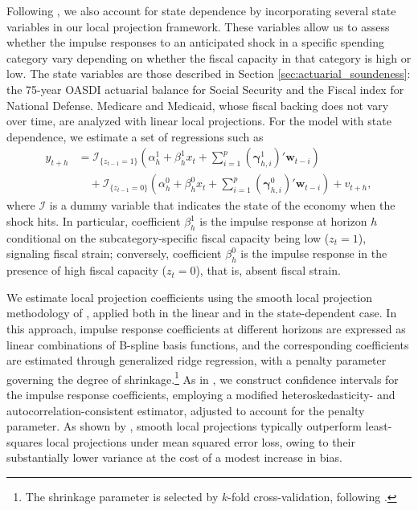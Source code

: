 \documentclass[12pt]{article}%
\theoremstyle{remark}
\begin{document}
Following \citet{RameyZuba2018}, we also account for state dependence by incorporating several state variables in our local projection framework. These variables allow us to assess whether the impulse responses to an anticipated shock in a specific spending category vary depending on whether the fiscal capacity in that category is high or low. The state variables are those described in Section \ref{sec:actuarial_soundeness}: the 75-year OASDI actuarial balance for Social Security and the Fiscal index for National Defense. Medicare and Medicaid, whose fiscal backing does not vary over time, are analyzed with linear local projections. For the model with state dependence, we estimate a set of regressions such as
\begin{align}
y_{t+h} 
&= \mathcal{I}_{\{z_{t-1}=1\}}\left(\alpha^1_{h} + \beta^1_{h} x_t + \sum_{i=1}^p \left(\bm{\gamma}^1_{h,i}\right)' \bm{w}_{t-i}\right) \nonumber \\ 
&\quad+ \mathcal{I}_{\{z_{t-1}=0\}}\left(\alpha^0_{h} + \beta^0_{h} x_t + \sum_{i=1}^p \left(\bm{\gamma}^0_{h,i}\right)' \bm{w}_{t-i}\right)
+ v_{t+h},
\label{eq:SDLP}
\end{align}
where $\mathcal{I}$ is a dummy variable that indicates the state of the economy when the shock hits. In particular, coefficient $\beta^1_h$ is the impulse response at horizon $h$ conditional on the subcategory-specific fiscal capacity being low ($z_t=1$), signaling fiscal strain; conversely, coefficient $\beta^0_h$ is the impulse response in the presence of high fiscal capacity ($z_t=0$), that is, absent fiscal strain.

We estimate local projection coefficients using the smooth local projection methodology of \citet{BarnichonBrownlees2019}, applied both in the linear and in the state-dependent case. In this approach, impulse response coefficients at different horizons are expressed as linear combinations of B-spline basis functions, and the corresponding coefficients are estimated through generalized ridge regression, with a penalty parameter governing the degree of shrinkage.\footnote{The shrinkage parameter is selected by $k$-fold cross-validation, following \citet{BarnichonBrownlees2019}.} As in \citet{BarnichonBrownlees2019}, we construct confidence intervals for the impulse response coefficients, employing a modified \citet{NeweyWest1987} heteroskedasticity- and autocorrelation-consistent estimator, adjusted to account for the penalty parameter. As shown by \citet{LiPlagborgMøllerWolf2024}, smooth local projections typically outperform least-squares local projections under mean squared error loss, owing to their substantially lower variance at the cost of a modest increase in bias.
\end{document}
